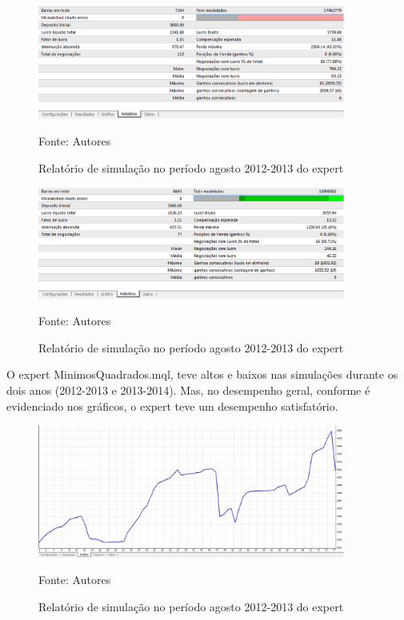 \begin{figure}[htp]
\centering
\includegraphics[width=0.9\textwidth]{figuras/protocoloMinimos}
\caption{Relatório de simulação no período agosto 2012-2013 do expert}{Fonte: Autores} 
\label{protocoloMinimos}
\end{figure}

\begin{figure}[htp]
\centering
\includegraphics[width=0.9\textwidth]{figuras/protocoloMinimos2}
\caption{Relatório de simulação no período agosto 2012-2013 do expert}{Fonte: Autores} 
\label{protocoloMinimos2}
\end{figure}

O expert MinimosQuadrados.mql, teve altos e baixos nas simulações durante os dois anos (2012-2013 e 2013-2014). Mas, no desempenho geral, conforme é evidenciado nos gráficos, o expert teve um desempenho satisfatório.

\begin{figure}[htp]
\centering
\includegraphics[width=0.9\textwidth]{figuras/protocoloMinimos3}
\caption{Relatório de simulação no período agosto 2012-2013 do expert}{Fonte: Autores} 
\label{protocoloMinimos3}
\end{figure}

